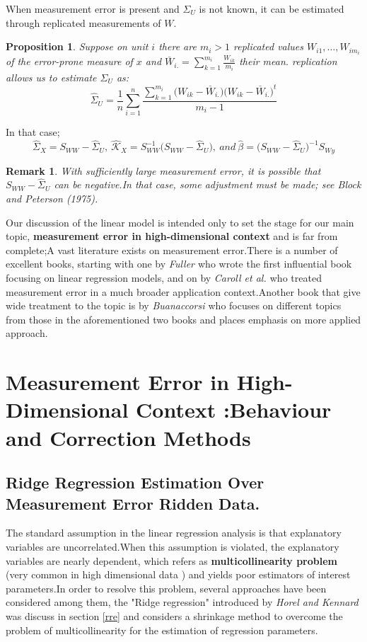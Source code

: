 \documentclass[12pt]{report}
\newtheorem {proposition}{Proposition}[section]  %
\newtheorem{remarque}{Remark}[section]
\begin{document}
When measurement error is present and $\Sigma_{U}$ is not known, it can be estimated through replicated measurements of $W$.
\begin{proposition}
	Suppose on unit $i$ there are $m_{i}>1$ replicated values $W_{i1},\dots,W_{im_{i}}$ of the error-prone measure of $x$ and $\overset{\_}{W}_{i.}=\sum_{k=1}^{m_{i}}\frac{W_{ik}}{m_{i}}$ their mean. replication allows us to estimate $\Sigma_{U}$ as:
	\begin{equation}
		\hat{\Sigma}_{U}=\frac{1}{n}\sum_{i=1}^{n}\frac{\sum_{k=1}^{m_{i}}\big(W_{ik}-\overset{\_}{W}_{i.}\big)\big(W_{ik}-\overset{\_}{W}_{i.}\big)^{t}}{m_{i}-1}
		\label{f55}
	\end{equation}
\end{proposition}
In that case; 
\begin{equation}
	\hat{\Sigma}_{X}=S_{WW}-\hat{\Sigma}_{U},\ \hat{\mathcal{K}}_{X}=S_{WW}^{-1}\big(S_{WW}-\hat{\Sigma}_{U}\big),\ and\ \hat{\beta}=\big(S_{WW}-\hat{\Sigma}_{U}\big)^{-1}S_{Wy}
\end{equation}
\begin{remarque}
	With sufficiently large measurement error, it is possible that $S_{WW}-\hat{\Sigma}_{U}$ can be negative.In that case, some adjustment must be made; \textit{see Block and Peterson (1975)}.
\end{remarque}

Our discussion of the linear model is intended only to set the stage for our main topic, \textbf{measurement error in high-dimensional context} and is far from complete;A vast literature exists on measurement error.There is a number of excellent books, starting with one by \textit{Fuller \cite{nref3}} who wrote the first influential book focusing on linear regression models, and on by \textit{Caroll et al. \cite{nref5}} who treated measurement error in a much broader application context.Another book that give wide treatment to the topic is by \textit{Buanaccorsi \cite{nref2}} who focuses on different topics from those in the aforementioned two books and places emphasis on more applied approach.
\section{Measurement Error in High-Dimensional Context :Behaviour and Correction Methods}
\subsection{ Ridge Regression Estimation Over Measurement Error Ridden Data.}
The standard assumption in the linear regression analysis is that explanatory variables are uncorrelated.When this assumption is violated, the explanatory variables are nearly dependent, which refers as \textbf{multicollinearity problem} (very common in high dimensional data ) and yields poor estimators of interest parameters.In order to resolve this problem, several approaches have been considered among them, the "Ridge regression" introduced by \textit{Horel and Kennard \cite{nref8}} was discuss in section \ref{rre} and considers a shrinkage method to overcome the problem of multicollinearity for the estimation of regression parameters.
\end{document}
